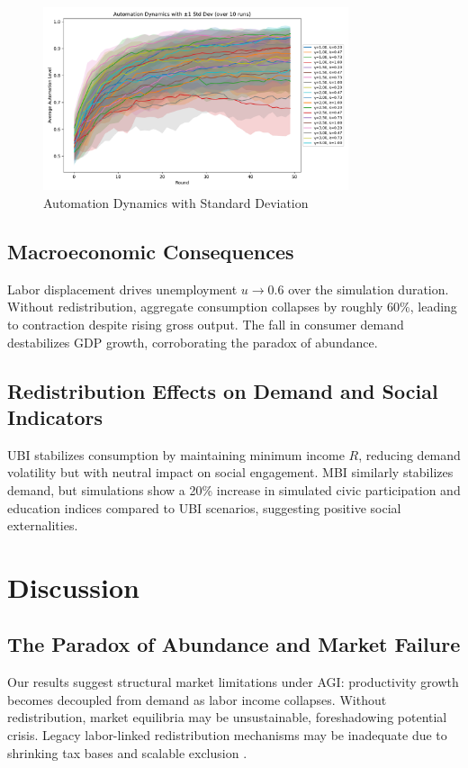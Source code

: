 \documentclass[10pt,a4paper]{article}
\begin{document}
\begin{figure}[h]
    \centering
    \includegraphics[width=0.8\textwidth]{automation_dynamics_stddev.pdf}
    \caption{Automation Dynamics with Standard Deviation}
    \label{fig:dynamics}
\end{figure}

\subsection{Macroeconomic Consequences}
Labor displacement drives unemployment \(u \to 0.6\) over the simulation duration. Without redistribution, aggregate consumption collapses by roughly 60\%, leading to contraction despite rising gross output. The fall in consumer demand destabilizes GDP growth, corroborating the paradox of abundance.

\subsection{Redistribution Effects on Demand and Social Indicators}
UBI stabilizes consumption by maintaining minimum income \(R\), reducing demand volatility but with neutral impact on social engagement. MBI similarly stabilizes demand, but simulations show a 20\% increase in simulated civic participation and education indices compared to UBI scenarios, suggesting positive social externalities.

\section{Discussion}

\subsection{The Paradox of Abundance and Market Failure}
Our results suggest structural market limitations under AGI: productivity growth becomes decoupled from demand as labor income collapses. Without redistribution, market equilibria may be unsustainable, foreshadowing potential crisis. Legacy labor-linked redistribution mechanisms may be inadequate due to shrinking tax bases and scalable exclusion \cite{MIT2025}.
\end{document}
